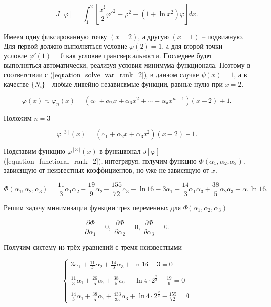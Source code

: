 \documentclass{article}
\begin{document}
\begin{equation}\label{equation_functional_rank_2}
	J[\varphi] = \int_{1}^{2} [\frac{x^2}{2}\varphi'^2 + \varphi^2 - (1 + \ln{x^2})\varphi]dx.
\end{equation}

Имеем одну фиксированную точку $(x=2)$, а другую $(x=1)$ – подвижную. Для первой должно выполняться условие $\varphi(2)=1$, а для второй точки – условие $\varphi'(1)=0$ как условие трансверсальности. Последнее будет выполняться автоматически, реализуя условия минимума функционала. Поэтому в соответствии с (\ref{equation_solve_var_rank_2}), в данном случае $\psi(x) = 1$, а в качестве $\lbrace N_{i} \rbrace$ - любые линейно независимые функции, равные нулю при $x=2$.

\begin{equation}
	\varphi(x) \approx \varphi_{n}(x) = (\alpha_{1} + \alpha_{2}x + \alpha_{3}x^2 + \cdots + \alpha_{n}x^{n-1})(x-2)+1.
\end{equation}

\noindent Положим $n = 3$

\begin{equation}
	\varphi^{[3]}(x) = (\alpha_{1} + \alpha_{2}x + \alpha_{3}x^2)(x-2)+1.
\end{equation}

\noindent Подставим функцию $\varphi^{[3]}(x)$ в функционал $J[\varphi]$ (\ref{equation_functional_rank_2}), интегрируя, получим функцию $\Phi(\alpha_{1}, \alpha_{2}, \alpha_{3})$, зависящую от неизвестных коэффициентов, но уже не зависящую от $x$.

\begin{equation}
	\Phi(\alpha_{1}, \alpha_{2}, \alpha_{3}) = \frac{11}{3}\alpha_{1}\alpha_{2} - \frac{19}{9}\alpha_{2} - \frac{155}{72}\alpha_{3} - \ln{16} - 3\alpha_{1} + \frac{14}{3}\alpha_{1}\alpha_{3} + \frac{38}{5}\alpha_{2}\alpha_{3} + \alpha_{1}\ln{16}.
\end{equation}

Решим задачу минимизации функции трех переменных для $\Phi(\alpha_{1}, \alpha_{2}, \alpha_{3})$

\begin{equation}
	\frac{\partial \Phi}{\partial \alpha_{1}} = 0, \;
	\frac{\partial \Phi}{\partial \alpha_{2}} = 0, \;
	\frac{\partial \Phi}{\partial \alpha_{3}} = 0.
\end{equation}

\noindent Получим систему из трёх уравнений с тремя неизвестными

\begin{equation}
	\begin{cases}
		3\alpha_{1} + \frac{11}{3}\alpha_{2} + \frac{14}{3}\alpha_{3} + \ln{16} - 3 = 0 \\
		\\
		\frac{11}{3}\alpha_{1} + \frac{26}{5}\alpha_{2} + \frac{38}{5}\alpha_{3} + \ln{4 \cdot 2^{\frac{2}{3}}} - \frac{19}{9} = 0 \\
		\\
		\frac{14}{3}\alpha_{1} + \frac{38}{5}\alpha_{2} + \frac{433}{35}\alpha_{3} + \ln{4 \cdot 2^{\frac{2}{3}}} - \frac{155}{72} = 0
	\end{cases}
\end{equation}
\end{document}
